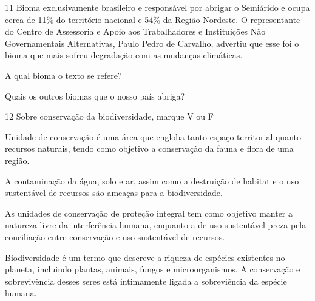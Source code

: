 \num{11}  Bioma exclusivamente brasileiro e responsável por abrigar o Semiárido
  e ocupa cerca de 11\% do território nacional e 54\% da Região
  Nordeste. O representante do Centro de Assessoria e Apoio aos
  Trabalhadores e Instituições Não Governamentais Alternativas, Paulo
  Pedro de Carvalho, advertiu que esse foi o bioma que mais sofreu
  degradação com as mudanças climáticas.


\begin{escolha}
\item A qual bioma o texto se refere?



\item Quais os outros biomas que o nosso país abriga?


\end{escolha}

\num{12}  Sobre conservação da biodiversidade, marque V ou F

\begin{boxlist}
\item Unidade de conservação é uma área que engloba tanto espaço
territorial quanto recursos naturais, tendo como objetivo a conservação
da fauna e flora de uma região. 

\item A contaminação da água, solo e ar, assim como a destruição de
habitat e o uso sustentável de recursos são ameaças para a
biodiversidade. 

\item As unidades de conservação de proteção integral tem como objetivo
manter a natureza livre da interferência humana, enquanto a de uso
sustentável preza pela conciliação entre conservação e uso sustentável
de recursos. 

\item Biodiversidade é um termo que descreve a riqueza de espécies
existentes no planeta, incluindo plantas, animais, fungos e
microorganismos. A conservação e sobrevivência desses seres está
intimamente ligada a sobreviência da espécie humana. 
\end{boxlist}

